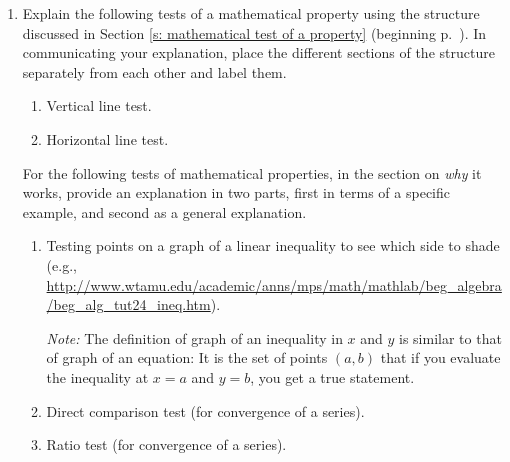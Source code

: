 \documentclass[11pt]{article}
\theoremstyle{definition}
\begin{document}
\begin{enumerate}[resume]
\item  Explain the following tests of a mathematical property using the structure 
discussed in Section \ref{s: mathematical test of a property} (beginning p.~\pageref{s: mathematical test of a property}). In communicating your explanation, place the different sections of the structure separately from each other and label them.
	\begin{enumerate}
	\item Vertical line test.
	\item Horizontal line test.
	\end{enumerate}
	For the following tests of mathematical properties, in the section on {\it why} it works, provide an explanation in two parts, first in terms of a specific example, and second as a general explanation.
	\begin{enumerate}[resume]
	\item Testing points on a graph of a linear inequality to see which side to shade (e.g., \url{http://www.wtamu.edu/academic/anns/mps/math/mathlab/beg_algebra/beg_alg_tut24_ineq.htm}).
	
	{\it Note:} The definition of graph of an inequality in $x$ and $y$ is similar to that of graph of an equation: It is the set of points $(a, b)$ that if you evaluate the inequality at $x=a$ and $y=b$, you get a true statement.
	
	\item Direct comparison test (for convergence of a series).
	\item Ratio test (for convergence of a series).
	\end{enumerate}
\end{enumerate}	
\end{document}
